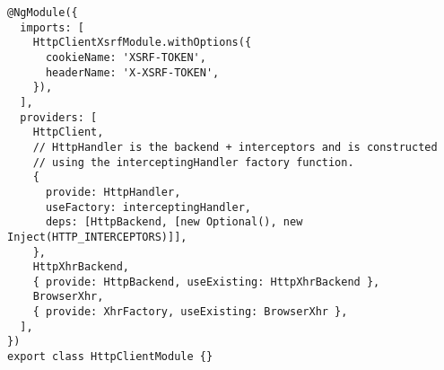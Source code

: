 \begin{verbatim}
@NgModule({
  imports: [
    HttpClientXsrfModule.withOptions({
      cookieName: 'XSRF-TOKEN',
      headerName: 'X-XSRF-TOKEN',
    }),
  ],
  providers: [
    HttpClient,
    // HttpHandler is the backend + interceptors and is constructed
    // using the interceptingHandler factory function.
    {
      provide: HttpHandler,
      useFactory: interceptingHandler,
      deps: [HttpBackend, [new Optional(), new Inject(HTTP_INTERCEPTORS)]],
    },
    HttpXhrBackend,
    { provide: HttpBackend, useExisting: HttpXhrBackend },
    BrowserXhr,
    { provide: XhrFactory, useExisting: BrowserXhr },
  ],
})
export class HttpClientModule {}
\end{verbatim}
